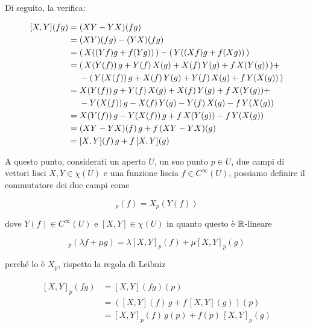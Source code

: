 Di seguito, la verifica:

\begin{align}
	\begin{split}
		[X,Y](fg) &= (XY-YX)(fg)\\
		&= (XY)(fg) - (YX)(fg)\\
		&= ( \, X((Yf) g + f (Y g)) \, ) - ( \, Y((Xf) g + f (X g)) \, )\\
		&= ( \, X(Y(f)) \, g + Y(f) \, X(g) + X(f) \, Y(g) + f \, X(Y(g)) \, ) + \\
		& \hal - ( \, Y(X(f)) \, g + X(f) \, Y(g) + Y(f) \, X(g) + f \, Y(X(g)) \, )\\
		&= X(Y(f)) \, g + Y(f) \, X(g) + X(f) \, Y(g) + f \, X(Y(g)) + \\
		& \hal - Y(X(f)) \, g - X(f) \, Y(g) - Y(f) \, X(g) - f \, Y(X(g))\\
		&= X(Y(f)) \, g - Y(X(f)) \, g + f \, X(Y(g)) - f \, Y(X(g))\\
		&= (XY-YX)(f) \, g + f \, (XY-YX)(g)\\
		&= [X,Y](f) \, g + f \, [X,Y](g)
	\end{split}
\end{align}

A questo punto, considerati un aperto $ U $, un suo punto $ p \in U $, due campi di vettori lisci $ X,Y \in \chi(U) $ e una funzione liscia $ f \in C^{\infty}(U) $, possiamo definire il commutatore dei due campi come

\begin{equation}
	[X,Y]_{p}(f) = X_{p} (Y(f))
\end{equation}

dove $ Y(f) \in C^{\infty}(U) $ e $ [X,Y] \in \chi(U) $ in quanto questo è $ \mathbb{R} $-lineare

\begin{equation}
	[X,Y]_{p}(\lambda f + \mu g) = \lambda [X,Y]_{p}(f) + \mu [X,Y]_{p}(g)
\end{equation}

perché lo è $ X_{p} $, rispetta la regola di Leibniz

\begin{align}
	\begin{split}
		[X,Y]_{p}(fg) &= [X,Y](fg)(p)\\
		&= ([X,Y](f) \, g + f \, [X,Y](g))(p)\\
		&= [X,Y]_{p}(f) \, g(p) + f(p) \, [X,Y]_{p}(g)
	\end{split}
\end{align}

